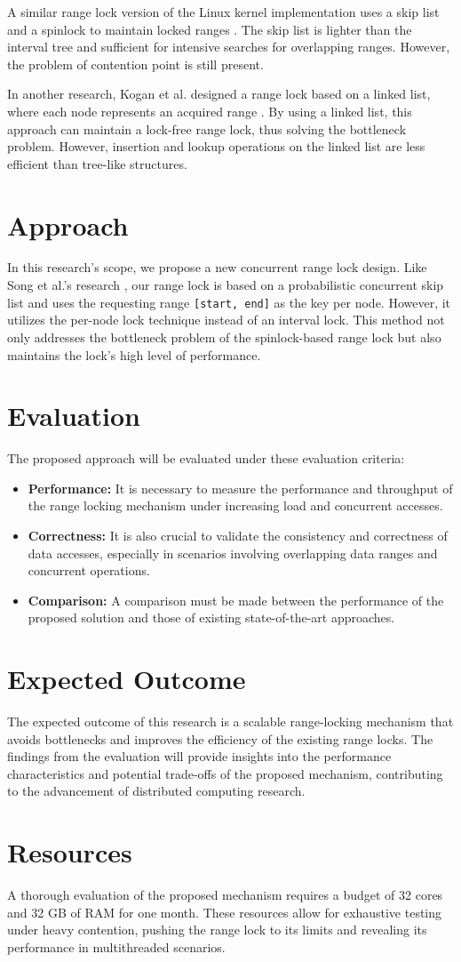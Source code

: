 A similar range lock version of the Linux kernel implementation uses a skip list and a spinlock to maintain locked ranges \parencite{migrationWM2023}.  The skip list is lighter than the interval tree and sufficient for intensive searches for overlapping ranges. However, the problem of contention point is still present.

In another research, Kogan et al. designed a range lock based on a linked list, where each node represents an acquired range \parencite{scalableRangeLock2020}. By using a linked list, this approach can maintain a lock-free range lock, thus solving the bottleneck problem. However, insertion and lookup operations on the linked list are less efficient than tree-like structures. 

\newpage

\section{Approach}
In this research's scope, we propose a new concurrent range lock design. Like Song et al.'s research \parencite{linuxRangeLockImpl2013}, our range lock is based on a probabilistic concurrent skip list and uses the requesting range \texttt{[start, end]} as the key per node. However, it utilizes the per-node lock technique instead of an interval lock. This method not only addresses the bottleneck problem of the spinlock-based range lock but also maintains the lock's high level of performance. 

\section{Evaluation}
The proposed approach will be evaluated under these evaluation criteria:
\begin{itemize}
    \item \textbf{Performance:} It is necessary to measure the performance and throughput of the range locking mechanism under increasing load and concurrent accesses.
    \item \textbf{Correctness:} It is also crucial to validate the consistency and correctness of data accesses, especially in scenarios involving overlapping data ranges and concurrent operations.
    \item \textbf{Comparison:} A comparison must be made between the performance of the proposed solution and those of existing state-of-the-art approaches.
\end{itemize}

\section{Expected Outcome}
The expected outcome of this research is a scalable range-locking mechanism that avoids bottlenecks and improves the efficiency of the existing range locks. The findings from the evaluation will provide insights into the performance characteristics and potential trade-offs of the proposed mechanism, contributing to the advancement of distributed computing research.

\section{Resources}
A thorough evaluation of the proposed mechanism requires a budget of 32 cores and 32 GB of RAM for one month. These resources allow for exhaustive testing under heavy contention, pushing the range lock to its limits and revealing its performance in multithreaded scenarios.